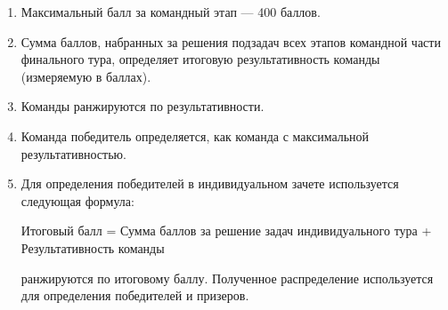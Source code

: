 \begin{enumerate}
    \item Максимальный балл за командный этап --- 400 баллов.
    \item Сумма баллов, набранных за решения подзадач всех этапов командной части финального тура, определяет итоговую результативность команды (измеряемую в баллах).
    \item Команды ранжируются по результативности.
    \item Команда победитель определяется, как команда с максимальной результативностью.
    \item Для определения победителей в индивидуальном зачете используется следующая формула:
    
    \begin{center}\footnotesize{Итоговый балл = Сумма баллов за решение задач индивидуального тура + Результативность команды}
        
    \end{center}
     ранжируются по итоговому баллу. Полученное распределение используется для определения победителей и призеров.
\end{enumerate} 